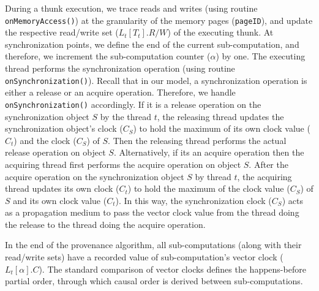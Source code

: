 During a thunk execution, we trace reads and writes  (using routine {\tt onMemoryAccess()}) at the granularity of the
memory pages ({\tt pageID}), and update the respective read/write set
($L_t[T_t].R/W$) of the executing thunk.  
At synchronization points, we define the end of the current sub-computation, and therefore, we increment the sub-computation  counter ($\alpha$) by one. The executing thread performs the synchronization operation (using routine {\tt onSynchronization()}). Recall that in our model, a synchronization operation is either a release or an acquire operation. Therefore, we handle {\tt onSynchronization()} accordingly. If it is a release operation on the synchronization object $S$ by the thread $t$, the 
releasing thread updates the synchronization object's clock ($C_S$) to
hold the maximum of its own clock value ($C_{t}$) and the clock  ($C_S$) of $S$. Then the releasing thread performs the actual release operation  on object $S$. Alternatively, if its an acquire operation then the acquiring thread first performs the acquire  operation on object $S$. After the acquire operation on the synchronization object $S$ by
thread $t$, the acquiring thread updates its own clock ($C_{t}$) to hold the
maximum of the clock value  ($C_S$) of $S$  and its own clock value ($C_{t}$).  
In this way, the synchronization clock ($C_S$) acts as a propagation medium to pass the
vector clock value from the thread doing the release to the thread doing the acquire operation. 



In the end of the provenance algorithm, all sub-computations (along with their read/write sets) have a recorded value of sub-computation's vector clock ($L_t[\alpha].C$). The standard comparison of vector clocks defines the  happens-before partial order, through which causal order is derived between sub-computations.


